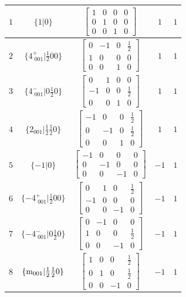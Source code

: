 \documentclass[fleqn,8pt]{jsarticle}
\begin{document}
\begin{longtable}{ccccc}
$ 1 $ & $ \{1|0\} $ & $ \begin{bmatrix} 1 & 0 & 0 & 0 \\ 0 & 1 & 0 & 0 \\ 0 & 0 & 1 & 0 \end{bmatrix} $ & $ 1 $ & $ 1 $ \\ \hline
$ 2 $ & $ \{4^{+}_{\,\,001}|\frac{1}{2} 0 0\} $ & $ \begin{bmatrix} 0 & -1 & 0 & \frac{1}{2} \\ 1 & 0 & 0 & 0 \\ 0 & 0 & 1 & 0 \end{bmatrix} $ & $ 1 $ & $ 1 $ \\ \hline
$ 3 $ & $ \{4^{-}_{\,\,001}|0 \frac{1}{2} 0\} $ & $ \begin{bmatrix} 0 & 1 & 0 & 0 \\ -1 & 0 & 0 & \frac{1}{2} \\ 0 & 0 & 1 & 0 \end{bmatrix} $ & $ 1 $ & $ 1 $ \\ \hline
$ 4 $ & $ \{2{}_{001}|\frac{1}{2} \frac{1}{2} 0\} $ & $ \begin{bmatrix} -1 & 0 & 0 & \frac{1}{2} \\ 0 & -1 & 0 & \frac{1}{2} \\ 0 & 0 & 1 & 0 \end{bmatrix} $ & $ 1 $ & $ 1 $ \\ \hline
$ 5 $ & $ \{-1|0\} $ & $ \begin{bmatrix} -1 & 0 & 0 & 0 \\ 0 & -1 & 0 & 0 \\ 0 & 0 & -1 & 0 \end{bmatrix} $ & $ -1 $ & $ 1 $ \\ \hline
$ 6 $ & $ \{-4^{+}_{\,\,001}|\frac{1}{2} 0 0\} $ & $ \begin{bmatrix} 0 & 1 & 0 & \frac{1}{2} \\ -1 & 0 & 0 & 0 \\ 0 & 0 & -1 & 0 \end{bmatrix} $ & $ -1 $ & $ 1 $ \\ \hline
$ 7 $ & $ \{-4^{-}_{\,\,001}|0 \frac{1}{2} 0\} $ & $ \begin{bmatrix} 0 & -1 & 0 & 0 \\ 1 & 0 & 0 & \frac{1}{2} \\ 0 & 0 & -1 & 0 \end{bmatrix} $ & $ -1 $ & $ 1 $ \\ \hline
$ 8 $ & $ \{{\rm m}_{001}|\frac{1}{2} \frac{1}{2} 0\} $ & $ \begin{bmatrix} 1 & 0 & 0 & \frac{1}{2} \\ 0 & 1 & 0 & \frac{1}{2} \\ 0 & 0 & -1 & 0 \end{bmatrix} $ & $ -1 $ & $ 1 $ \\ \hline

\end{longtable}
\end{document}
